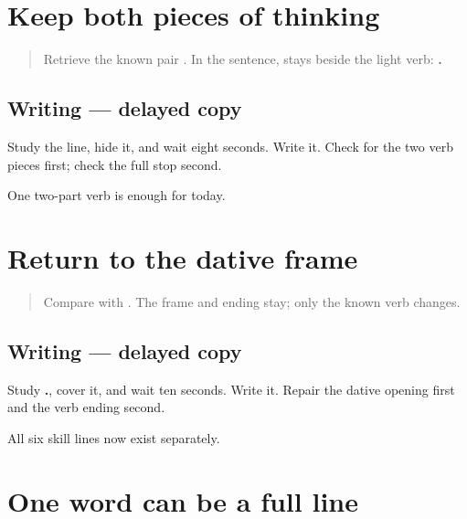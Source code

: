 \section[mī vichār karto]{Keep both pieces of thinking}

\label{lesson:MR-A1M08-thinking-line}



\begin{quote}
Retrieve the known pair \textbf{ }. In the sentence, \textbf{} stays beside the light verb: \textbf{  .}
\end{quote}

\subsection*{Writing — delayed copy}
Study the line, hide it, and wait eight seconds. Write it. Check for the two verb pieces first; check the full stop second.

\begin{tcolorbox}[breakable,colback=teal!4,colframe=teal!35!black,title={Before you move on}]
One two-part verb is enough for today.
\end{tcolorbox}
\section[malā marāṭhī samajte]{Return to the dative frame}

\label{lesson:MR-A1M09-understanding-line}



\begin{quote}
Compare \textbf{  } with \textbf{  }. The frame and ending stay; only the known verb changes.
\end{quote}

\subsection*{Writing — delayed copy}
Study \textbf{  .}, cover it, and wait ten seconds. Write it. Repair the dative opening first and the verb ending second.

\begin{tcolorbox}[breakable,colback=teal!4,colframe=teal!35!black,title={Before you move on}]
All six skill lines now exist separately.
\end{tcolorbox}
\section[dhanyavād]{One word can be a full line}

